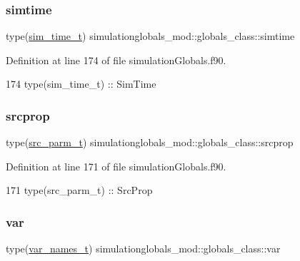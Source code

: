 \subsubsection{\texorpdfstring{simtime}{simtime}}
{\footnotesize\ttfamily type(\mbox{\hyperlink{structsimulationglobals__mod_1_1sim__time__t}{sim\+\_\+time\+\_\+t}}) simulationglobals\+\_\+mod\+::globals\+\_\+class\+::simtime\hspace{0.3cm}{\ttfamily [private]}}



Definition at line 174 of file simulation\+Globals.\+f90.


\begin{DoxyCode}
174         \textcolor{keywordtype}{type}(sim\_time\_t)    :: SimTime
\end{DoxyCode}
\mbox{\label{structsimulationglobals__mod_1_1globals__class_a3f6c36b781f6b2e6168362b764f54a68}} 
\subsubsection{\texorpdfstring{srcprop}{srcprop}}
{\footnotesize\ttfamily type(\mbox{\hyperlink{structsimulationglobals__mod_1_1src__parm__t}{src\+\_\+parm\+\_\+t}}) simulationglobals\+\_\+mod\+::globals\+\_\+class\+::srcprop\hspace{0.3cm}{\ttfamily [private]}}



Definition at line 171 of file simulation\+Globals.\+f90.


\begin{DoxyCode}
171         \textcolor{keywordtype}{type}(src\_parm\_t)    :: SrcProp
\end{DoxyCode}
\mbox{\label{structsimulationglobals__mod_1_1globals__class_a752c7c8dc10d072eda09d345a69dca1e}} 
\subsubsection{\texorpdfstring{var}{var}}
{\footnotesize\ttfamily type(\mbox{\hyperlink{structsimulationglobals__mod_1_1var__names__t}{var\+\_\+names\+\_\+t}}) simulationglobals\+\_\+mod\+::globals\+\_\+class\+::var\hspace{0.3cm}{\ttfamily [private]}}



